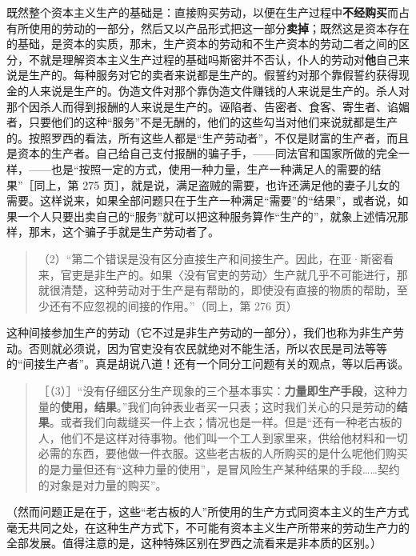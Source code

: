 既然整个资本主义生产的基础是：直接购买劳动，以便在生产过程中\textbf{不经购买}而占有所使用的劳动的一部分，然后又以产品形式把这一部分\textbf{卖掉}；既然这是资本存在的基础，是资本的实质，那末，生产资本的劳动和不生产资本的劳动二者之间的区分，不就是理解资本主义生产过程的基础吗斯密并不否认，仆人的劳动对\textbf{他}自己来说是生产的。每种服务对它的卖者来说都是生产的。假誓约对那个靠假誓约获得现金的人来说是生产的。伪造文件对那个靠伪造文件赚钱的人来说是生产的。杀人对那个因杀人而得到报酬的人来说是生产的。诬陷者、告密者、食客、寄生者、谄媚者，只要他们的这种“服务”不是无酬的，他们的这些勾当对他们来说就都是生产的。按照罗西的看法，所有这些人都是“生产劳动者”，不仅是财富的生产者，而且是资本的生产者。自己给自己支付报酬的骗子手，——同法官和国家所做的完全一样，——也是“按照一定的方式，使用一种力量，生产一种满足人的需要的结果”［同上，第 275 页］，就是说，满足盗贼的需要，也许还满足他的妻子儿女的需要。这样说来，如果全部问题只在于生产一种满足“需要”的“结果”，或者说，如果一个人只要出卖自己的“服务”就可以把这种服务算作“生产的”，就象上述情况那样，那末，这个骗子手就是生产劳动者了。

\begin{quote}（2）“第二个错误是没有区分直接生产和间接生产。因此，在亚·斯密看来，官吏是非生产的。如果〈没有官吏的劳动〉生产就几乎不可能进行，那就很清楚，这种劳动对于生产是有帮助的，即使没有直接的物质的帮助，至少还有不应忽视的间接的作用。”（同上，第 276 页）\end{quote}

这种间接参加生产的劳动（它不过是非生产劳动的一部分），我们也称为非生产劳动。否则就必须说，因为官吏没有农民就绝对不能生活，所以农民是司法等等的“间接生产者”。真是胡说八道！还有一个同分工问题有关的观点，等以后再谈。

\begin{quote}［（3）］“没有仔细区分生产现象的三个基本事实：\textbf{力量即生产手段}，这种力量的\textbf{使用，结果}。”我们向钟表业者买一只表；这时我们关心的只是劳动的\textbf{结果}。或者我们向裁缝买一件上衣；情况也是一样。但是“还有一种老古板的人，他们不是这样对待事物。他们叫一个工人到家里来，供给他材料和一切必需的东西，要他做一件衣服。这些老古板的人所购买的是什么呢他们购买的是力量\fontbox{~\{}但还有“这种力量的使用”\fontbox{\}~}，是冒风险生产某种结果的手段……契约的对象是对力量的购买”。\end{quote}

（然而问题正是在于，这些“老古板的人”所使用的生产方式同资本主义的生产方式毫无共同之处，在这种生产方式下，不可能有资本主义生产所带来的劳动生产力的全部发展。值得注意的是，这种特殊区别在罗西之流看来是非本质的区别。）

